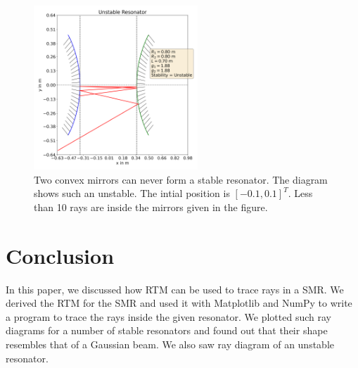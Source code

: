 \documentclass[12pt]{article}
\begin{document}
\begin{figure}
    \centering
    \includegraphics[width=0.55\textwidth]{images/unstable.png}
    \caption{Two convex mirrors can never form a stable resonator. The diagram shows such an unstable. The intial position is \([-0.1, 0.1]^T\). Less than 10 rays are inside the mirrors given in the figure.}
    \label{fig:unstable}
\end{figure}
\clearpage
\newpage
\section{Conclusion}
In this paper, we discussed how RTM can be used to trace rays in a SMR. We derived the RTM for the SMR and used it with {\color{cyan}Matplotlib} and {\color{cyan}NumPy} to write a program to trace the rays inside the given resonator. We plotted such ray diagrams for a number of stable resonators and found out that their shape resembles that of a Gaussian beam. We also saw ray diagram of an unstable resonator.
\printbibliography
\end{document}
